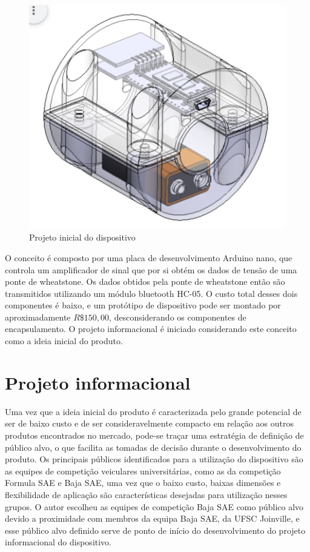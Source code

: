 \begin{figure}[htb]
	\caption{\label{fig:2029} Projeto inicial do dispositivo}
	\begin{center}
		\includegraphics[width=\textwidth]{pictures/2029.png}
	\end{center}
\end{figure}

O conceito é composto por uma placa de desenvolvimento Arduino nano, que controla um amplificador de sinal que por si obtém os dados de tensão de uma ponte de wheatstone.
Os dados obtidos pela ponte de wheatstone então são transmitidos utilizando um módulo bluetooth HC-05.
O custo total desses dois componentes é baixo, e um protótipo de dispositivo pode ser montado por aproximadamente $R\$150,00$, desconsiderando os componentes de encapsulamento.
O projeto informacional é iniciado considerando este conceito como a ideia inicial do produto.

\section{Projeto informacional}

Uma vez que a ideia inicial do produto é caracterizada pelo grande potencial de ser de baixo custo e de ser consideravelmente compacto em relação aos outros produtos encontrados no
mercado, pode-se traçar uma estratégia de definição de público alvo, o que facilita as tomadas de decisão durante o desenvolvimento do produto.
Os principais públicos identificados para a utilização do dispositivo são as equipes de competição veiculares universitárias, como as da competição Formula SAE e Baja SAE,
uma vez que o baixo custo, baixas dimensões e flexibilidade de aplicação são características desejadas para utilização nesses grupos.
O autor escolheu as equipes de competição Baja SAE como público alvo devido a proximidade com membros da equipa Baja SAE, da UFSC Joinville, e esse público alvo definido serve de ponto
de início do desenvolvimento do projeto informacional do dispositivo.

